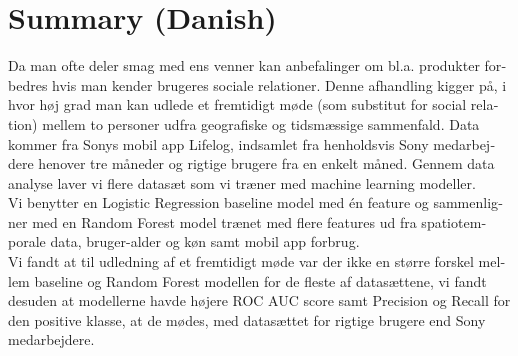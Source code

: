 \chapter{Summary (Danish)}
\begin{otherlanguage}{danish}
Da man ofte deler smag med ens venner kan anbefalinger om bl.a. produkter forbedres hvis man kender brugeres sociale relationer.
Denne afhandling kigger på, i hvor høj grad man kan udlede et fremtidigt møde (som substitut for social relation) mellem to personer udfra geografiske og tidsmæssige sammenfald.
Data kommer fra Sonys mobil app Lifelog, indsamlet fra henholdsvis Sony medarbejdere henover tre måneder og rigtige brugere fra en enkelt måned.
Gennem data analyse laver vi flere datasæt som vi træner med machine learning modeller.\\
Vi benytter en Logistic Regression baseline model med én feature og sammenligner med en Random Forest model trænet med flere features ud fra spatiotemporale data, bruger-alder og køn samt mobil app forbrug. \\
Vi fandt at til udledning af et fremtidigt møde var der ikke en større forskel mellem baseline og Random Forest modellen for de fleste af datasættene, vi fandt desuden at modellerne havde højere ROC AUC score samt Precision og Recall for den positive klasse, at de mødes, med datasættet for rigtige brugere end Sony medarbejdere.

\end{otherlanguage}